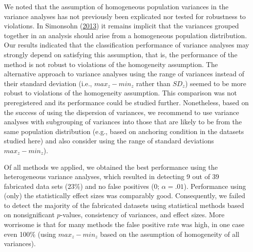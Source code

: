 \documentclass[a5paper]{book}
\begin{document}
We noted that the assumption of homogeneous population variances in the
variance analyses has not previously been explicated nor tested for
robustness to violations. In Simonsohn
(\protect\hyperlink{ref-doi:10.1177ux2f0956797613480366}{2013}) it
remains implicit that the variances grouped together in an analysis
should arise from a homogeneous population distribution. Our results
indicated that the classification performance of variance analyses may
strongly depend on satisfying this assumption, that is, the performance
of the method is not robust to violations of the homogeneity assumption.
The alternative approach to variance analyses using the range of
variances instead of their standard deviation (i.e., \(max_{z}-min_{z}\)
rather than \(SD_z\)) seemed to be more robust to violations of the
homogeneity assumption. This comparison was not preregistered and its
performance could be studied further. Nonetheless, based on the success
of using the dispersion of variances, we recommend to use variance
analyses with subgrouping of variances into those that are likely to be
from the same population distribution (e.g., based on anchoring
condition in the datasets studied here) and also consider using the
range of standard deviations \(max_{z}-min_{z}\)).

Of all methods we applied, we obtained the best performance using the
heterogeneous variance analyses, which resulted in detecting 9 out of 39
fabricated data sets (23\%) and no false positives (0; \(\alpha=.01\)).
Performance using (only) the statistically effect sizes was comparably
good. Consequently, we failed to detect the majority of the fabricated
datasets using statistical methods based on nonsignificant \(p\)-values,
consistency of variances, and effect sizes. More worrisome is that for
many methods the false positive rate was high, in one case even 100\%
(using \(max_{z}-min_{z}\) based on the assumption of homogeneity of all
variances).
\end{document}
